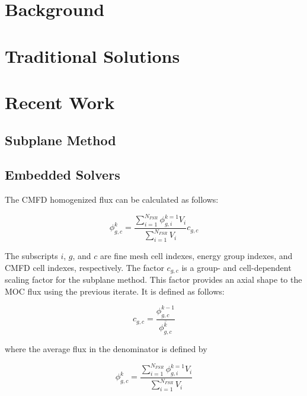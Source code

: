 \section{Background}


\section{Traditional Solutions}


\section{Recent Work}

\subsection{Subplane Method}


\subsection{Embedded Solvers}

The CMFD homogenized flux can be calculated as follows:

\begin{equation}\label{e:CMFDsubplaneFlux}
\phi^k_{g,c} = \frac{\sum_{i=1}^{N_{FSR}} \phi^{k=1}_{g,i} V_i}{\sum_{i=1}^{N_{FSR}} V_i} c_{g,c}
\end{equation}

The subscripts $i$, $g$, and $c$ are fine mesh cell indexes, energy group indexes, and CMFD cell indexes, respectively.  The factor $c_{g,c}$ is a group- and cell-dependent scaling factor for the subplane method.  This factor provides an axial shape to the MOC flux using the previous iterate.  It is defined as follows:

\begin{equation}\label{e:CMFDsubplaneFactor}
c_{g,c} = \frac{\phi^{k-1}_{g,c}}{\overline{\phi^k_{g,c}}}
\end{equation}

where the average flux in the denominator is defined by

\begin{equation}\label{e:CMFDaverageFlux}
\phi^k_{g,c} = \frac{\sum_{i=1}^{N_{FSR}} \phi^{k=1}_{g,i} V_i}{\sum_{i=1}^{N_{FSR}} V_i}
\end{equation}

